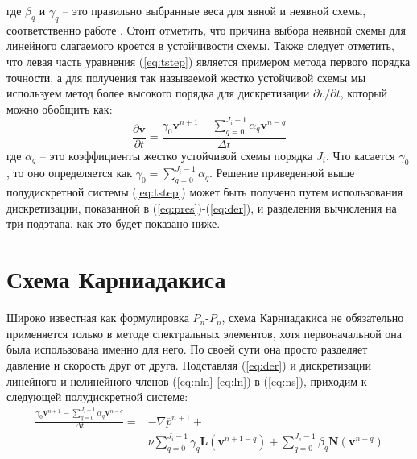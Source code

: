 %
где $\beta_q$ и $\gamma_q$ -- это правильно выбранные веса для явной и неявной схемы, 
соответственно  работе \cite{gear1971numerical}.
%
Стоит отметить, что причина выбора неявной схемы для линейного слагаемого кроется в устойчивости схемы.
%
Также следует отметить, что левая часть уравнения (\ref{eq:tstep}) является примером метода первого порядка точности, 
а для получения так называемой жестко устойчивой схемы мы используем метод более высокого порядка 
для дискретизации $\partial v/\partial t$, который можно обобщить как:
%
%
\begin{equation}\label{eq:der}
    \frac{\partial \textbf{v}}{\partial t} = \frac{\gamma_0 \textbf{v}^{n+1} - \sum_{q=0}^{J_i-1}\alpha_q \textbf{v}^{n-q} }{\Delta t}
\end{equation}        
%
где $\alpha_q$ -- это коэффициенты жестко устойчивой схемы порядка $J_i$. 
%
Что касается $\gamma_0$, то оно определяется как $\gamma_0 = \sum_{q=0}^{J_i-1} \alpha_q$.
%
Решение приведенной выше полудискретной системы (\ref{eq:tstep}) может быть получено 
путем использования дискретизации, показанной в (\ref{eq:pres})-(\ref{eq:der}), 
и разделения вычисления на три подэтапа, как это будет показано ниже.

\section{Схема Карниадакиса}
%

Широко известная как формулировка $P_n$-$P_n$, схема Карниадакиса не обязательно применяется только  в методе 
спектральных элементов, хотя первоначальной она была использована именно для него. 
%
По своей сути она просто разделяет давление и скорость друг от друга. 
%
Подставляя (\ref{eq:der}) и дискретизации линейного и нелинейного членов (\ref{eq:nln}-\ref{eq:ln}) 
в (\ref{eq:ns}), приходим к следующей полудискретной системе:
%
%
\begin{equation}\label{eq:sheme}
\begin{split}
    \frac{\gamma_0 \textbf{v}^{n+1} - \sum_{q=0}^{J_i-1}\alpha_q \textbf{v}^{n-q} }{\Delta t} = & - \nabla \overline{p}^{n+1} + \\
    & \nu \sum_{q=0}^{J_i-1} \gamma_q \textbf{L}(\textbf{v}^{n+1-q}) + \sum_{q=0}^{J_e-1} \beta_q \textbf{N}(\textbf{v}^{n-q})
\end{split}
\end{equation}        
%

